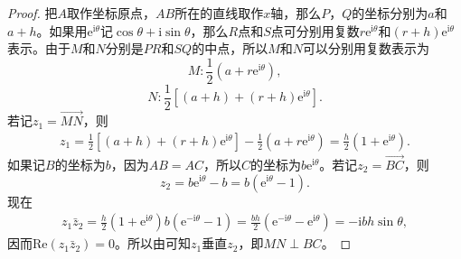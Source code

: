 \documentclass[../../main.tex]{subfiles}%
\begin{document}
\begin{proof}
把\(A\)取作坐标原点，\(AB\)所在的直线取作\(x\)轴，那么\(P\)，\(Q\)的坐标分别为\(a\)和\(a + h\)。如果用\(\mathrm{e}^{\mathrm{i}\theta}\)记\(\cos\theta + \mathrm{i}\sin\theta\)，那么\(R\)点和\(S\)点可分别用复数\(r\mathrm{e}^{\mathrm{i}\theta}\)和\((r + h)\mathrm{e}^{\mathrm{i}\theta}\)表示。由于\(M\)和\(N\)分别是\(PR\)和\(SQ\)的中点，所以\(M\)和\(N\)可以分别用复数表示为
\[
M: \frac{1}{2}(a + r\mathrm{e}^{\mathrm{i}\theta}),
\]
\[
N: \frac{1}{2}[(a + h) + (r + h)\mathrm{e}^{\mathrm{i}\theta}].
\]
若记\(z_1 = \overrightarrow{MN}\)，则
\[
\begin{split}
z_1 = \frac{1}{2}[(a + h) + (r + h)\mathrm{e}^{\mathrm{i}\theta}] - \frac{1}{2}(a + r\mathrm{e}^{\mathrm{i}\theta}) = \frac{h}{2}(1 + \mathrm{e}^{\mathrm{i}\theta}).
\end{split}
\]
如果记\(B\)的坐标为\(b\)，因为\(AB = AC\)，所以\(C\)的坐标为\(b\mathrm{e}^{\mathrm{i}\theta}\)。若记\(z_2 = \overrightarrow{BC}\)，则
\[
z_2 = b\mathrm{e}^{\mathrm{i}\theta} - b = b(\mathrm{e}^{\mathrm{i}\theta} - 1).
\]
现在
\[
\begin{split}
z_1\bar{z}_2 = \frac{h}{2}(1 + \mathrm{e}^{\mathrm{i}\theta})b(\mathrm{e}^{-\mathrm{i}\theta} - 1) = \frac{bh}{2}(\mathrm{e}^{-\mathrm{i}\theta} - \mathrm{e}^{\mathrm{i}\theta}) = -\mathrm{i}bh\sin\theta,
\end{split}
\]
因而\(\mathrm{Re}(z_1\bar{z}_2) = 0\)。所以由可知\(z_1\)垂直\(z_2\)，即\(MN \perp BC\)。 
\end{proof}
\end{document}
